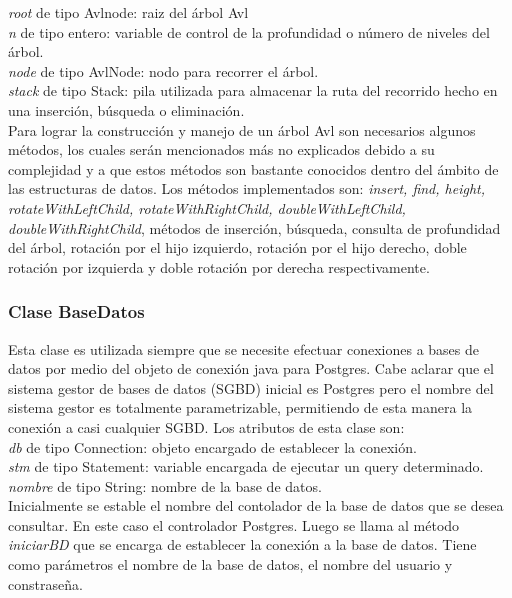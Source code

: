  \textit{root} de tipo Avlnode: raiz del \'arbol Avl\\

 \textit{n} de tipo entero: variable de control de la profundidad o n\'umero de niveles del \'arbol.\\

 \textit{node} de tipo AvlNode: nodo para recorrer el \'arbol.\\

 \textit{stack} de tipo Stack: pila utilizada para almacenar la ruta del recorrido hecho en una inserci\'on,
 b\'usqueda o eliminaci\'on.\\

Para lograr la construcci\'on y manejo de un \'arbol Avl son necesarios algunos m\'etodos, los cuales ser\'an
mencionados m\'as no explicados debido a su complejidad y a que estos m\'etodos son bastante conocidos dentro del
\'ambito de las estructuras de datos. Los m\'etodos implementados son: \textit{insert, find, height,
rotateWithLeftChild, rotateWithRightChild, doubleWithLeftChild, doubleWithRightChild}, m\'etodos de inserci\'on,
b\'usqueda, consulta de profundidad del \'arbol, rotaci\'on por el hijo izquierdo, rotaci\'on por el hijo derecho,
doble rotaci\'on por izquierda y doble rotaci\'on por derecha respectivamente.

\subsubsection{Clase BaseDatos}
Esta clase es utilizada siempre que se necesite efectuar conexiones a bases de datos por medio del objeto de
conexi\'on java para Postgres. Cabe aclarar que el sistema gestor de bases de datos (SGBD) inicial es Postgres pero
el nombre del sistema gestor es totalmente parametrizable, permitiendo de esta manera la conexi\'on a casi
cualquier SGBD. Los atributos de esta clase son:\\

 \textit{db} de tipo Connection: objeto encargado de establecer la conexi\'on.\\

 \textit{stm} de tipo Statement: variable encargada de ejecutar un query determinado.\\

 \textit{nombre} de tipo String: nombre de la base de datos.\\

Inicialmente se estable el nombre del contolador de la base de datos que se desea consultar. En este caso el
controlador Postgres. Luego se llama al m\'etodo \textit{iniciarBD} que se encarga de establecer la conexi\'on a la
base de datos. Tiene como par\'ametros el nombre de la base de datos, el nombre del usuario y constrase\~na.\\

